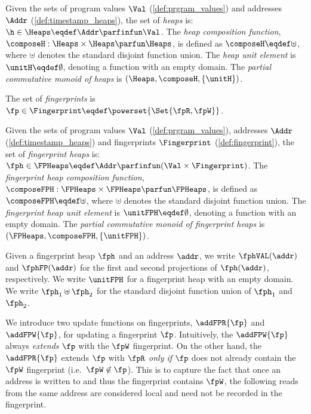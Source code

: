 \begin{definition}[Heaps]\label{def:heaps}
Given the sets of program values $\Val$ (\ref{def:prgram_values}) and  addresses $\Addr$ (\ref{def:timestamp_heaps}), the set of \emph{ heaps} is: $\h \in \Heaps \eqdef \Addr \parfinfun \Val$.
The \emph{heap composition function}, $\composeH: \Heaps \times \Heaps \parfun \Heaps$, is defined as $\composeH \eqdef \uplus$, where $\uplus$ denotes the standard disjoint function union. The \emph{ heap unit element} is $\unitH \eqdef \emptyset$, denoting a function with an empty domain.
The \emph{partial commutative monoid of  heaps} is $(\Heaps, \composeH, \{\unitH\})$.
\end{definition}
 
\begin{defn}[Fingerprints]
\label{def:fingerprint}
The set of \emph{fingerprints} is $\fp \in \Fingerprint \eqdef \powerset{\Set{\fpR,\fpW}}$.
\end{defn}
 
\begin{defn}
\label{def:fingerprint_heaps}
Given the sets of program values $\Val$ (\ref{def:prgram_values}), addresses $\Addr$ (\ref{def:timestamp_heaps}) and fingerprints $\Fingerprint$ (\ref{def:fingerprint}), the set of \emph{fingerprint heaps} is: $\fph \in \FPHeaps \eqdef \Addr \parfinfun (\Val \times \Fingerprint)$.
The \emph{fingerprint heap composition function}, $\composeFPH: \FPHeaps \times \FPHeaps \parfun \FPHeaps$, is defined as $\composeFPH \eqdef \uplus$, where $\uplus$ denotes the standard disjoint function union. The \emph{fingerprint heap unit element} is $\unitFPH \eqdef \emptyset$, denoting a function with an empty domain.
The \emph{partial commutative monoid of fingerprint heaps} is $(\FPHeaps, \composeFPH, \{\unitFPH\})$.  
\end{defn}
 
Given a fingerprint heap $\fph$ and an address $\addr$, we write $\fphVAL(\addr)$ and $\fphFP(\addr)$ for the first and second projections of $\fph(\addr)$, respectively. We write $\unitFPH$ for a fingerprint heap with an empty domain. We write $\fph_1 \uplus \fph_2$ for the standard disjoint function union of $\fph_1$ and $\fph_2$. 

We introduce two update functions on fingerprints, $\addFPR{\fp}$ and $\addFPW{\fp}$, for updating a fingerprint $\fp$. Intuitively, the $\addFPW{\fp}$ always \emph{extends} $\fp$ with the $\fpW$ fingerprint. On the other hand, the $\addFPR{\fp}$ extends $\fp$ with $\fpR$ \emph{only if} $\fp$ does not already contain the $\fpW$ fingerprint (i.e.~$\fpW \not\in \fp$). This is to capture the fact that once an address is written to and thus the fingerprint contains $\fpW$, the following reads from the same address are considered local and need not be recorded in the fingerprint.
 
